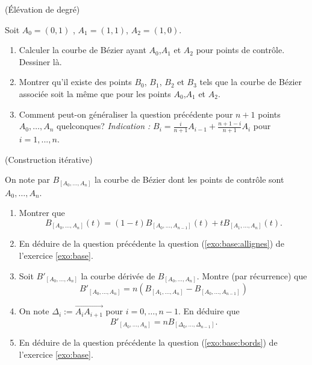 \documentclass[a4paper,12pt,reqno]{amsart}
\begin{document}
\begin{exo}\label{exo:elev} (Élévation de degré)

   Soit $A_{0}=(0,1)$ , $A_{1}=(1,1)$, $A_{2}=(1,0)$.
   \begin{enumerate}
     \item Calculer la courbe de Bézier ayant $A_{0}$,$ A_{1}$ et $A_{2}$ pour points de contrôle. Dessiner là.

     \item Montrer qu'il existe des points $B_{0}$, $B_{1}$, $B_{2}$ et $B_{3}$ tels que la courbe de Bézier associée soit la même que pour les points $A_{0}$,$ A_{1}$ et $A_{2}$.

     \item\label{exo:elev:gen} Comment peut-on généraliser la question précédente pour $n+1$ points $A_{0},\ldots,A_{n}$ quelconques?
     \textit{Indication :} $B_{i} = \frac{i}{n+1}A_{i-1}+\frac{n+1-i}{n+1}A_{i}$ pour $i=1,...,n$.
   \end{enumerate}

\end{exo}

\begin{exo} (Construction itérative)

  On note par $B_{[A_{0},\ldots,A_{n}]}$ la courbe de Bézier dont les points de contrôle sont $A_{0},\ldots,A_{n}$.
  \begin{enumerate}
    \item Montrer que
    $$
      B_{[A_{0},\ldots,A_{n}]}(t) = (1-t)B_{[A_{0},\ldots,A_{n-1}]}(t) +tB_{[A_{1},\ldots,A_{n}]}(t).
    $$

    \item En déduire de la question précédente la question (\ref{exo:base:allignes}) de l'exercice \ref{exo:base}.

    \item Soit $B'_{[A_{0},\ldots,A_{n}]}$ la courbe dérivée de $B_{[A_{0},\ldots,A_{n}]}$. Montre (par récurrence) que
    $$
      B'_{[A_{0},\ldots,A_{n}]} = n\left(B_{[A_{1},\ldots,A_{n}]} - B_{[A_{0},\ldots,A_{n-1}]}\right)
    $$

    \item On note $\Delta_{i} := \overrightarrow{A_{i}A_{i+1}}$ pour $i=0,\ldots,n-1$. En déduire que
    $$
      B'_{[A_{0},\ldots,A_{n}]} = nB_{[\Delta_{0},\ldots,\Delta_{n-1}]}.
    $$

    \item En déduire de la question précédente la question (\ref{exo:base:bords}) de l'exercice \ref{exo:base}.
  \end{enumerate}
\end{exo}
\end{document}
